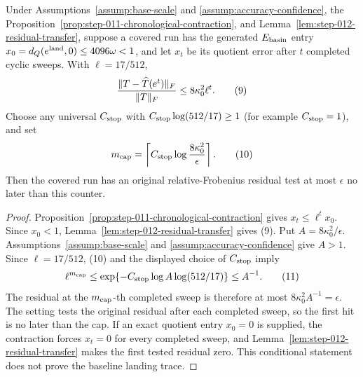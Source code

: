\begin{proposition}\label{prop:step-012-stop-cap}
Under Assumptions~\ref{assump:base-scale} and
\ref{assump:accuracy-confidence}, the Proposition~\ref{prop:step-011-chronological-contraction}, and
Lemma~\ref{lem:step-012-residual-transfer}, suppose a covered run has the
generated \(E_{\rm basin}\) entry
\(x_0=d_Q(e^{\rm land},0)\le4096\omega<1\), and let \(x_t\) be its quotient
error after \(t\) completed cyclic sweeps. With \(\ell=17/512\),
\[
 { \|T-\widehat T(e^t)\|_F\over\|T\|_F}
 \le8\kappa_0^2\ell^t.
\tag{9}
\]
Choose any universal \(C_{\rm stop}\) with
\(C_{\rm stop}\log(512/17)\ge1\) (for example \(C_{\rm stop}=1\)), and set
\[
 m_{\rm cap}=\left\lceil C_{\rm stop}\log{8\kappa_0^2\over\epsilon}\right\rceil.
\tag{10}
\]
Then the covered run has an original relative-Frobenius residual test at most
\(\epsilon\) no later than this counter.

\begin{proof}
Proposition~\ref{prop:step-011-chronological-contraction} gives
\(x_t\le\ell^t x_0\). Since \(x_0<1\),
Lemma~\ref{lem:step-012-residual-transfer} gives (9). Put
\(A=8\kappa_0^2/\epsilon\). Assumptions~\ref{assump:base-scale} and
\ref{assump:accuracy-confidence} give \(A>1\). Since \(\ell=17/512\),
(10) and the displayed choice of \(C_{\rm stop}\) imply
\[
 \ell^{m_{\rm cap}}
 \le\exp\{-C_{\rm stop}\log A\log(512/17)\}\le A^{-1}.
\tag{11}
\]
The residual at the \(m_{\rm cap}\)-th completed sweep is therefore at most
\(8\kappa_0^2A^{-1}=\epsilon\). The setting tests the original residual after
each completed sweep, so the first hit is no later than the cap. If an exact
quotient entry \(x_0=0\) is supplied, the contraction forces
\(x_t=0\) for every completed sweep, and
Lemma~\ref{lem:step-012-residual-transfer} makes the first tested residual
zero. This conditional statement does not prove the baseline landing trace.



\end{proof}
\end{proposition}
